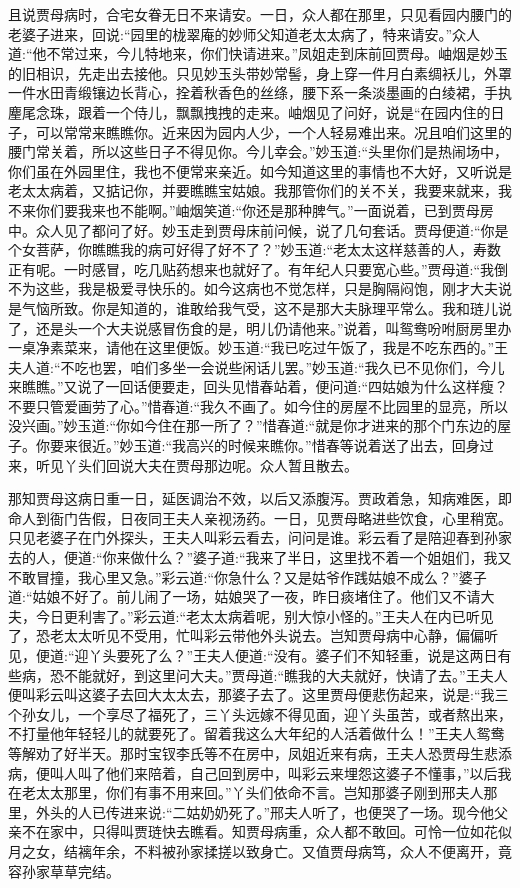 \begin{parag}
    且说贾母病时，合宅女眷无日不来请安。一日，众人都在那里，只见看园内腰门的老婆子进来，回说:“园里的栊翠庵的妙师父知道老太太病了，特来请安。”众人道:“他不常过来，今儿特地来，你们快请进来。”凤姐走到床前回贾母。岫烟是妙玉的旧相识，先走出去接他。只见妙玉头带妙常髻，身上穿一件月白素绸袄儿，外罩一件水田青缎镶边长背心，拴着秋香色的丝绦，腰下系一条淡墨画的白绫裙，手执麈尾念珠，跟着一个侍儿，飘飘拽拽的走来。岫烟见了问好，说是“在园内住的日子，可以常常来瞧瞧你。近来因为园内人少，一个人轻易难出来。况且咱们这里的腰门常关着，所以这些日子不得见你。今儿幸会。”妙玉道:“头里你们是热闹场中，你们虽在外园里住，我也不便常来亲近。如今知道这里的事情也不大好，又听说是老太太病着，又掂记你，并要瞧瞧宝姑娘。我那管你们的关不关，我要来就来，我不来你们要我来也不能啊。”岫烟笑道:“你还是那种脾气。”一面说着，已到贾母房中。众人见了都问了好。妙玉走到贾母床前问候，说了几句套话。贾母便道:“你是个女菩萨，你瞧瞧我的病可好得了好不了？”妙玉道:“老太太这样慈善的人，寿数正有呢。一时感冒，吃几贴药想来也就好了。有年纪人只要宽心些。”贾母道:“我倒不为这些，我是极爱寻快乐的。如今这病也不觉怎样，只是胸隔闷饱，刚才大夫说是气恼所致。你是知道的，谁敢给我气受，这不是那大夫脉理平常么。我和琏儿说了，还是头一个大夫说感冒伤食的是，明儿仍请他来。”说着，叫鸳鸯吩咐厨房里办一桌净素菜来，请他在这里便饭。妙玉道:“我已吃过午饭了，我是不吃东西的。”王夫人道:“不吃也罢，咱们多坐一会说些闲话儿罢。”妙玉道:“我久已不见你们，今儿来瞧瞧。”又说了一回话便要走，回头见惜春站着，便问道:“四姑娘为什么这样瘦？不要只管爱画劳了心。”惜春道:“我久不画了。如今住的房屋不比园里的显亮，所以没兴画。”妙玉道:“你如今住在那一所了？”惜春道:“就是你才进来的那个门东边的屋子。你要来很近。”妙玉道:“我高兴的时候来瞧你。”惜春等说着送了出去，回身过来，听见丫头们回说大夫在贾母那边呢。众人暂且散去。
\end{parag}


\begin{parag}
    那知贾母这病日重一日，延医调治不效，以后又添腹泻。贾政着急，知病难医，即命人到衙门告假，日夜同王夫人亲视汤药。一日，见贾母略进些饮食，心里稍宽。只见老婆子在门外探头，王夫人叫彩云看去，问问是谁。彩云看了是陪迎春到孙家去的人，便道:“你来做什么？”婆子道:“我来了半日，这里找不着一个姐姐们，我又不敢冒撞，我心里又急。”彩云道:“你急什么？又是姑爷作践姑娘不成么？”婆子道:“姑娘不好了。前儿闹了一场，姑娘哭了一夜，昨日痰堵住了。他们又不请大夫，今日更利害了。”彩云道:“老太太病着呢，别大惊小怪的。”王夫人在内已听见了，恐老太太听见不受用，忙叫彩云带他外头说去。岂知贾母病中心静，偏偏听见，便道:“迎丫头要死了么？”王夫人便道:“没有。婆子们不知轻重，说是这两日有些病，恐不能就好，到这里问大夫。”贾母道:“瞧我的大夫就好，快请了去。”王夫人便叫彩云叫这婆子去回大太太去，那婆子去了。这里贾母便悲伤起来，说是:“我三个孙女儿，一个享尽了福死了，三丫头远嫁不得见面，迎丫头虽苦，或者熬出来，不打量他年轻轻儿的就要死了。留着我这么大年纪的人活着做什么！”王夫人鸳鸯等解劝了好半天。那时宝钗李氏等不在房中，凤姐近来有病，王夫人恐贾母生悲添病，便叫人叫了他们来陪着，自己回到房中，叫彩云来埋怨这婆子不懂事，”以后我在老太太那里，你们有事不用来回。”丫头们依命不言。岂知那婆子刚到邢夫人那里，外头的人已传进来说:“二姑奶奶死了。”邢夫人听了，也便哭了一场。现今他父亲不在家中，只得叫贾琏快去瞧看。知贾母病重，众人都不敢回。可怜一位如花似月之女，结褵年余，不料被孙家揉搓以致身亡。又值贾母病笃，众人不便离开，竟容孙家草草完结。
\end{parag}


